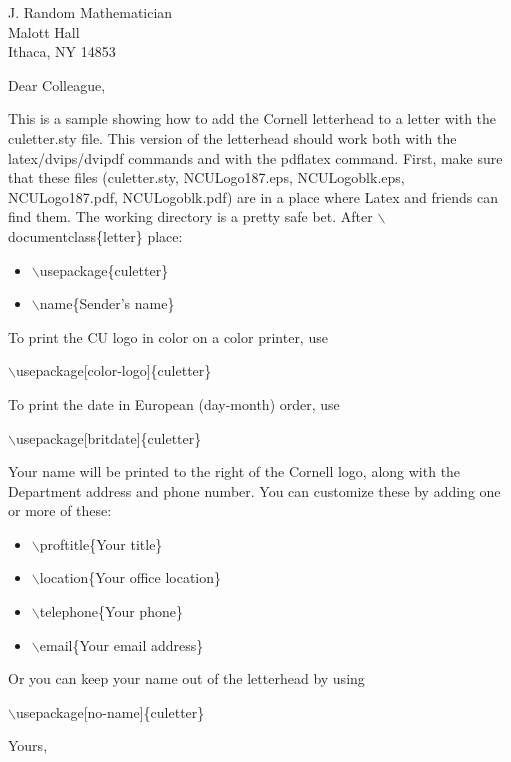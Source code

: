 \documentclass{letter}
\def\bs{$\backslash$}
\begin{document}
\begin{letter}{J. Random Mathematician\\ Malott Hall\\ Ithaca, NY 14853}

\opening{Dear Colleague,}

This is a sample showing how to add the Cornell letterhead to a letter
with the culetter.sty file.  This version of the letterhead should
work both with the latex/dvips/dvipdf commands and with the pdflatex
command.  First, make sure that these files (culetter.sty,
NCULogo187.eps, NCULogoblk.eps, NCULogo187.pdf, NCULogoblk.pdf) are in
a place where Latex and friends can find them.  The working directory
is a pretty safe bet.  After \bs documentclass\{letter\} place:

\begin{itemize}
\item \bs usepackage\{culetter\}
\item \bs name\{Sender's name\}  
\end{itemize}

To print the CU logo in color on a color printer, use

\bs usepackage[color-logo]\{culetter\}

To print the date in European (day-month) order, use

\bs usepackage[britdate]\{culetter\}

Your name will be printed to the right of the Cornell logo, along with the
Department address and phone number.  You can customize these by adding one or more of these:
\begin{itemize}
\item \bs proftitle\{Your title\}
\item \bs location\{Your office location\}
\item \bs telephone\{Your phone\}
\item \bs email\{Your email address\}
\end{itemize}

Or you can keep your name out of the letterhead by using

\bs usepackage[no-name]\{culetter\}

\closing{Yours,}

\end{letter}
\end{document}
